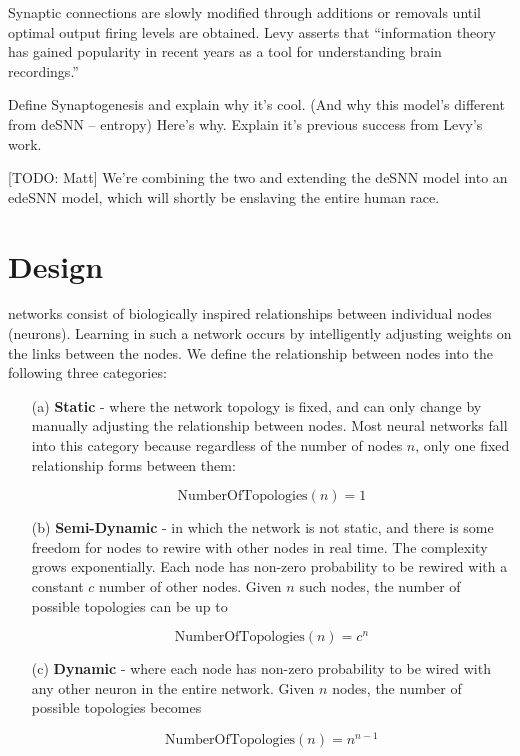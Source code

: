 \documentclass[journal]{./sty/IEEEtran}
\begin{document}
Synaptic connections are slowly modified through additions or removals until optimal output firing levels are obtained. 
Levy asserts that  ``information theory has gained popularity in recent years as a tool for understanding brain recordings.''


Define Synaptogenesis and explain why it's cool. (And why this model's different from deSNN -- entropy)
Here's why. 
Explain it's previous success from Levy's work.

\hfill

[TODO: Matt] We're combining the two and extending the deSNN model into an edeSNN model, which will shortly be enslaving the entire human race.


\section{Design}
 networks consist of biologically inspired relationships between individual nodes (neurons). Learning in such a network occurs by intelligently adjusting weights on the links between the nodes. We define the relationship between nodes into the following three categories:

\begin{itemize}
\item[(a)] {\bf Static} - where the network topology is fixed, and can only change by manually adjusting the relationship between nodes. Most neural networks fall into this category because regardless of the number of nodes \(n\), only one fixed relationship forms between them:

\[
\text{NumberOfTopologies}(n) = 1
\]


\item[(b)] {\bf Semi-Dynamic} - in which the network is not static, and there is some freedom for nodes to rewire with other nodes in real time. The complexity grows exponentially. Each node has non-zero probability to be rewired with a constant \(c\) number of other nodes. Given \(n\) such nodes, the number of possible topologies can be up to

\[
\text{NumberOfTopologies}(n) = c^n
\]


\item[(c)] {\bf Dynamic} - where each node has non-zero probability to be wired with any other neuron in the entire network. Given \(n\) nodes, the number of possible topologies becomes

\[
\text{NumberOfTopologies}(n) = n^{n-1}
\]


\end{itemize}
\end{document}
